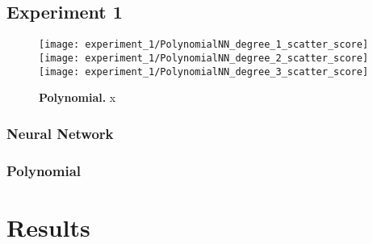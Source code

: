 \subsection{Experiment 1}


\begin{figure}[!ht]
\centering
\texttt{[image: experiment\_1/PolynomialNN\_degree\_1\_scatter\_score]}
\texttt{[image: experiment\_1/PolynomialNN\_degree\_2\_scatter\_score]}
\texttt{[image: experiment\_1/PolynomialNN\_degree\_3\_scatter\_score]}
\caption[Experiment 1: Polynomial]{
  \textbf{Polynomial.}
  x
}
\label{fig:polynomialNN_results}
\end{figure}


\subsubsection{Neural Network}

\subsubsection{Polynomial}

\section{Results}
